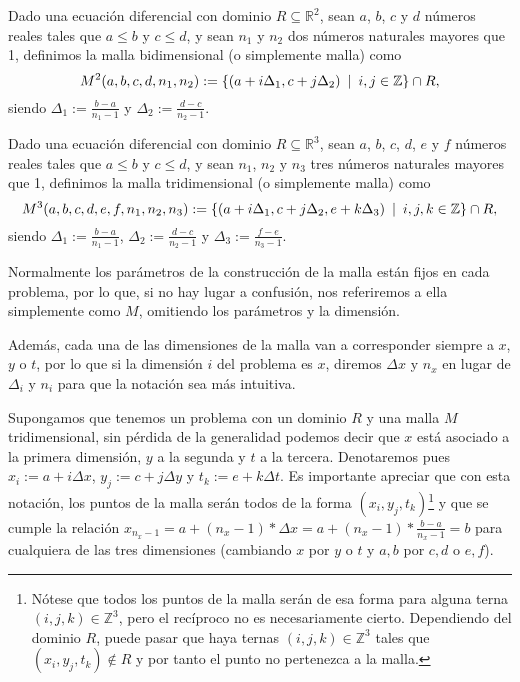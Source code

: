 \begin{definicion}\label{def:malla2d}
	Dado una ecuación diferencial con dominio $R\subseteq\mathbb{R}^2$, sean $a$, $b$, $c$ y $d$ números reales tales que $a\leq b$ y $c\leq d$, y sean $n_1$ y $n_2$ dos números naturales mayores que 1, definimos la malla bidimensional (o simplemente malla) como
	\begin{equation}
		M^2(a,b,c,d,n_1,n_2) := \{(a+i\Delta_1,c+j\Delta_2) \hspace{5px} | \hspace{5px} i,j\in\mathbb{Z}\}\cap R,
	\end{equation}
	siendo $\Delta_1:=\frac{b-a}{n_1-1}$ y $\Delta_2:=\frac{d-c}{n_2-1}$.
\end{definicion}
\begin{definicion}\label{def:malla3d}
	Dado una ecuación diferencial con dominio $R\subseteq\mathbb{R}^3$, sean $a$, $b$, $c$, $d$, $e$ y $f$ números reales tales que $a\leq b$ y $c\leq d$, y sean $n_1$, $n_2$ y $n_3$ tres números naturales mayores que 1, definimos la malla tridimensional (o simplemente malla) como
	\begin{equation}
		M^3(a,b,c,d,e,f,n_1,n_2,n_3) := \{(a+i\Delta_1,c+j\Delta_2,e+k\Delta_3) \hspace{5px} | \hspace{5px} i,j,k\in\mathbb{Z}\}\cap R,
	\end{equation}
	siendo $\Delta_1:=\frac{b-a}{n_1-1}$, $\Delta_2:=\frac{d-c}{n_2-1}$ y $\Delta_3:=\frac{f-e}{n_3-1}$.
\end{definicion}

Normalmente los parámetros de la construcción de la malla están fijos en cada problema, por lo que, si no hay lugar a confusión, nos referiremos a ella simplemente como $M$, omitiendo los parámetros y la dimensión.

Además, cada una de las dimensiones de la malla van a corresponder siempre a $x$, $y$ o $t$, por lo que si la dimensión $i$ del problema es $x$, diremos $\Delta x$ y $n_x$ en lugar de $\Delta_i$ y $n_i$ para que la notación sea más intuitiva.

Supongamos que tenemos un problema con un dominio $R$ y una malla $M$ tridimensional, sin pérdida de la generalidad podemos decir que $x$ está asociado a la primera dimensión, $y$ a la segunda y $t$ a la tercera. Denotaremos pues $x_i:=a+i\Delta x$, $y_j:=c+j\Delta y$ y $t_k:=e+k\Delta t$. Es importante apreciar que con esta notación, los puntos de la malla serán todos de la forma $(x_i,y_j,t_k)$\footnote{Nótese que todos los puntos de la malla serán de esa forma para alguna terna $(i,j,k)\in\mathbb{Z}^3$, pero el recíproco no es necesariamente cierto. Dependiendo del dominio $R$, puede pasar que haya ternas $(i,j,k)\in\mathbb{Z}^3$ tales que $(x_i,y_j,t_k)\notin R$ y por tanto el punto no pertenezca a la malla.} y que se cumple la relación $x_{n_x-1}=a+(n_x-1)*\Delta x = a + (n_x-1)*\frac{b-a}{n_x-1}=b$ para cualquiera de las tres dimensiones (cambiando $x$ por $y$ o $t$ y $a,b$ por $c,d$ o $e,f$).

